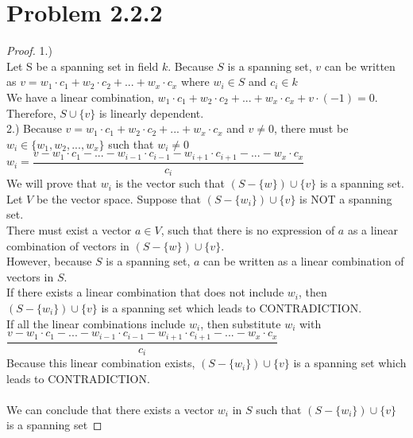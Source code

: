 \documentclass[12pt]{article}
\begin{document}
\newpage 

\section{Problem 2.2.2}

\begin{proof}
	1.)
 \\ Let S be a spanning set in field $k$. Because $S$ is a spanning set, $v$ can be written as $v=w_1 \cdot c_1 + w_2 \cdot c_2 + ... + w_x \cdot c_x$ where $w_i \in S$ and $c_i \in k$
 \\ We have a linear combination, $w_1 \cdot c_1 + w_2 \cdot c_2 + ... + w_x \cdot c_x + v \cdot (-1) = 0$. Therefore, $S \cup \{v\}$ is linearly dependent.
 \\
 2.) Because $v=w_1 \cdot c_1 + w_2 \cdot c_2 + ... + w_x \cdot c_x$ and $v \neq 0$, there must be $w_i \in \{w_1, w_2, ...,w_x \}$ such that $w_i \neq 0$
 \\$w_i = \dfrac{v-w_1\cdot c_1-...-w_{i-1}\cdot c_{i-1}-w_{i+1}\cdot c_{i+1}-...-w_x\cdot c_x}{c_i}$
 \\ We will prove that $w_i$ is the vector such that $(S-\{w\}) \cup \{v\}$ is a spanning set.
 \\ Let $V$ be the vector space. Suppose that $(S-\{w_i\}) \cup \{v\}$ is NOT a spanning set. \\There must exist a vector $a \in V$, such that there is no expression of $a$ as a linear combination of vectors in $(S-\{w\}) \cup \{v\}$.
 \\ However, because $S$ is a spanning set, $a$ can be written as a linear combination of vectors in $S$.
 \\ If there exists a linear combination that does not include $w_i$, then $(S-\{w_i\}) \cup \{v\}$ is a spanning set which leads to CONTRADICTION.
 \\ If all the linear combinations include $w_i$, then substitute $w_i$ with
 \\$\dfrac{v-w_1\cdot c_1-...-w_{i-1}\cdot c_{i-1}-w_{i+1}\cdot c_{i+1}-...-w_x\cdot c_x}{c_i}$
 \\Because this linear combination exists, $(S-\{w_i\}) \cup \{v\}$ is a spanning set which leads to CONTRADICTION.
 \\
 \\We can conclude that there exists a vector $w_i$ in $S$ such that $(S-\{w_i\}) \cup \{v\}$ is a spanning set
\end{proof}

\newpage 
\end{document}

